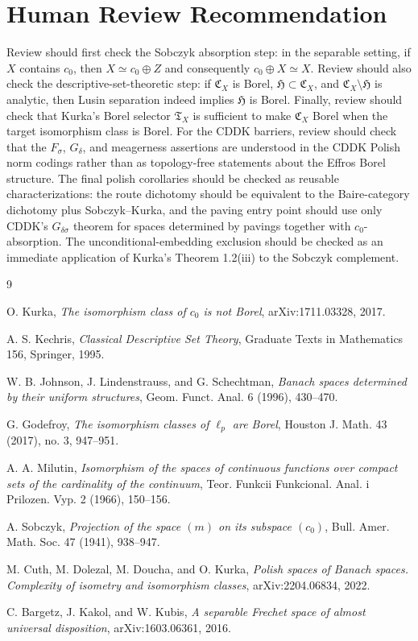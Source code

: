 \documentclass[11pt]{article}
\begin{document}
\section*{Human Review Recommendation}

Review should first check the Sobczyk absorption step: in the separable setting,
if \(X\) contains \(c_0\), then \(X\simeq c_0\oplus Z\) and consequently
\(c_0\oplus X\simeq X\).  Review should also check the descriptive-set-theoretic
step: if \(\mathfrak C_X\) is Borel, \(\mathfrak H\subset\mathfrak C_X\), and
\(\mathfrak C_X\setminus\mathfrak H\) is analytic, then Lusin separation indeed
implies \(\mathfrak H\) is Borel.  Finally, review should check that Kurka's
Borel selector \(\mathfrak T_X\) is sufficient to make \(\mathfrak C_X\) Borel
when the target isomorphism class is Borel.  For the CDDK barriers,
review should check that the \(F_\sigma\), \(G_\delta\), and meagerness assertions are
understood in the CDDK Polish norm codings rather than as topology-free
statements about the Effros Borel structure.  The final polish corollaries
should be checked as reusable characterizations: the route dichotomy should be
equivalent to the Baire-category dichotomy plus Sobczyk--Kurka, and the paving
entry point should use only CDDK's \(G_{\delta\sigma}\) theorem for spaces
determined by pavings together with \(c_0\)-absorption.  The
unconditional-embedding exclusion should be checked as an immediate application
of Kurka's Theorem 1.2(iii) to the Sobczyk complement.

\begin{thebibliography}{9}

O. Kurka,
\emph{The isomorphism class of \(c_0\) is not Borel},
arXiv:1711.03328, 2017.

A. S. Kechris,
\emph{Classical Descriptive Set Theory},
Graduate Texts in Mathematics 156, Springer, 1995.

W. B. Johnson, J. Lindenstrauss, and G. Schechtman,
\emph{Banach spaces determined by their uniform structures},
Geom. Funct. Anal. 6 (1996), 430--470.

G. Godefroy,
\emph{The isomorphism classes of \(\ell_p\) are Borel},
Houston J. Math. 43 (2017), no. 3, 947--951.

A. A. Milutin,
\emph{Isomorphism of the spaces of continuous functions over compact sets of
the cardinality of the continuum},
Teor. Funkcii Funkcional. Anal. i Prilozen. Vyp. 2 (1966), 150--156.

A. Sobczyk,
\emph{Projection of the space \((m)\) on its subspace \((c_0)\)},
Bull. Amer. Math. Soc. 47 (1941), 938--947.

M. Cuth, M. Dolezal, M. Doucha, and O. Kurka,
\emph{Polish spaces of Banach spaces. Complexity of isometry and isomorphism classes},
arXiv:2204.06834, 2022.

C. Bargetz, J. Kakol, and W. Kubis,
\emph{A separable Frechet space of almost universal disposition},
arXiv:1603.06361, 2016.

\end{thebibliography}
\end{document}
